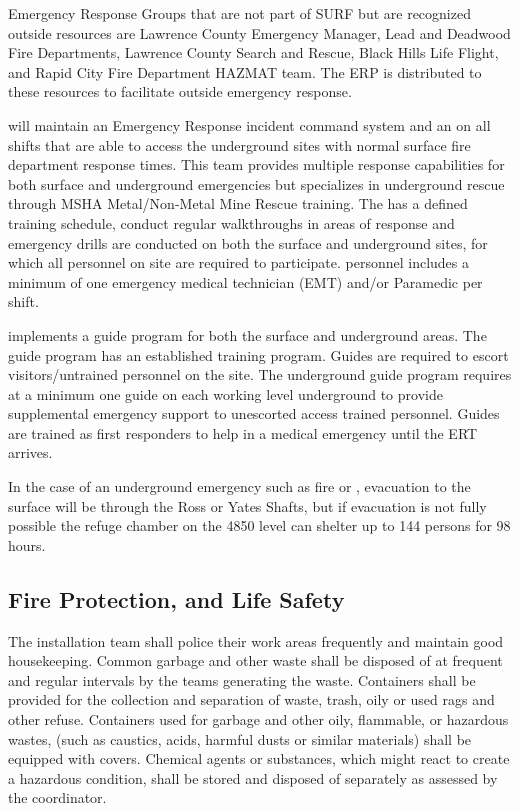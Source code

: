 Emergency Response Groups that are not part of SURF but are recognized
outside resources are Lawrence County Emergency Manager, Lead and
Deadwood Fire Departments, Lawrence County Search and Rescue, Black
Hills Life Flight, and Rapid City Fire Department HAZMAT team. The
 ERP is distributed to these resources to facilitate outside
emergency response.

 will maintain an Emergency Response incident command
system and an  on all shifts that are able to access the
underground sites with normal surface fire department response
times. This team provides multiple response capabilities for both
surface and underground emergencies but specializes in underground
rescue through MSHA Metal/Non-Metal Mine Rescue training. The
 has a defined training schedule, conduct regular
walkthroughs in areas of response and emergency drills are conducted
on both the surface and underground sites, for which all personnel on
site are required to participate.  personnel includes a
minimum of one emergency medical technician (EMT) and/or Paramedic per
shift.

 implements a guide program for both the surface and
underground areas. The guide program has an established training
program. Guides are required to escort visitors/untrained personnel on
the  site. The underground guide program requires at a
minimum one guide on each working level underground to provide
supplemental emergency support to unescorted access trained
personnel. Guides are trained as first responders to help in a medical
emergency until the ERT arrives.

In the case of an underground emergency such as fire or ,
evacuation to the surface will be through the Ross or Yates Shafts,
but if evacuation is not fully possible the refuge chamber on the 4850
level can shelter up to 144 persons for 98 hours.

\subsection{Fire Protection,  and Life Safety}

The  installation team shall police their work areas
frequently and maintain good housekeeping. Common garbage and other
waste shall be disposed of at frequent and regular intervals by the
teams generating the waste. Containers shall be provided for the
collection and separation of waste, trash, oily or used rags and other
refuse.  Containers used for garbage and other oily, flammable, or
hazardous wastes, (such as caustics, acids, harmful dusts or similar
materials) shall be equipped with covers.  Chemical agents or
substances, which might react to create a hazardous condition, shall
be stored and disposed of separately as assessed by the
  coordinator.

